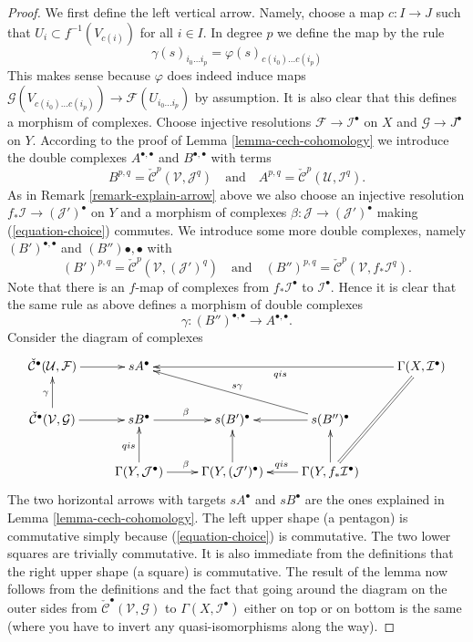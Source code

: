 \begin{proof}
We first define the left vertical arrow. Namely, choose a map
$c : I \to J$ such that $U_i \subset f^{-1}(V_{c(i)})$ for all
$i \in I$. In degree $p$ we define the map by the rule
$$
\gamma(s)_{i_0 \ldots i_p} = \varphi(s)_{c(i_0) \ldots c(i_p)}
$$
This makes sense because $\varphi$ does indeed induce maps
$\mathcal{G}(V_{c(i_0) \ldots c(i_p)}) \to \mathcal{F}(U_{i_0 \ldots i_p})$
by assumption. It is also clear that this defines a morphism of complexes.
Choose injective resolutions
$\mathcal{F} \to \mathcal{I}^\bullet$ on $X$ and
$\mathcal{G} \to J^\bullet$ on $Y$. According to
the proof of Lemma \ref{lemma-cech-cohomology} we introduce the double
complexes $A^{\bullet, \bullet}$ and $B^{\bullet, \bullet}$
with terms
$$
B^{p, q} = \check{\mathcal{C}}^p(\mathcal{V}, \mathcal{J}^q)
\quad
\text{and}
\quad
A^{p, q} = \check{\mathcal{C}}^p(\mathcal{U}, \mathcal{I}^q).
$$
As in Remark \ref{remark-explain-arrow} above we also choose an
injective resolution
$f_*\mathcal{I} \to (\mathcal{J}')^\bullet$ on $Y$ and a morphism
of complexes $\beta : \mathcal{J} \to (\mathcal{J}')^\bullet$
making (\ref{equation-choice}) commutes. We introduce some more
double complexes, namely $(B')^{\bullet, \bullet}$ and
$(B''){\bullet, \bullet}$ with
$$
(B')^{p, q} = \check{\mathcal{C}}^p(\mathcal{V}, (\mathcal{J}')^q)
\quad
\text{and}
\quad
(B'')^{p, q} = \check{\mathcal{C}}^p(\mathcal{V}, f_*\mathcal{I}^q).
$$
Note that there is an $f$-map of complexes from
$f_*\mathcal{I}^\bullet$ to $\mathcal{I}^\bullet$. Hence
it is clear that the same rule as above defines a morphism
of double complexes
$$
\gamma : (B'')^{\bullet, \bullet} \longrightarrow A^{\bullet, \bullet}.
$$
Consider the diagram of complexes
$$
\xymatrix{
\check{\mathcal{C}}^\bullet(\mathcal{U}, \mathcal{F})
\ar[r] &
sA^\bullet & & &
\Gamma(X, \mathcal{I}^\bullet) \ar[lll]^{qis}
\ar@{=}[ddl]\\
\check{\mathcal{C}}^\bullet(\mathcal{V}, \mathcal{G})
\ar[r] \ar[u]^\gamma &
sB^\bullet \ar[r]^\beta &
s(B')^\bullet &
s(B'')^\bullet \ar[l] \ar[llu]_{s\gamma} \\
& \Gamma(Y, \mathcal{J}^\bullet) \ar[u]^{qis} \ar[r]^\beta &
\Gamma(Y, (\mathcal{J}')^\bullet) \ar[u] &
\Gamma(Y, f_*\mathcal{I}^\bullet) \ar[u] \ar[l]_{qis}
}
$$
The two horizontal arrows with targets $sA^\bullet$ and
$sB^\bullet$ are the ones explained in Lemma \ref{lemma-cech-cohomology}.
The left upper shape (a pentagon) is commutative simply
because (\ref{equation-choice}) is commutative.
The two lower squares are trivially commutative.
It is also immediate from the definitions that the
right upper shape (a square) is commutative.
The result of the lemma now follows from the definitions
and the fact that going around the diagram on the outer sides
from $\check{\mathcal{C}}^\bullet(\mathcal{V}, \mathcal{G})$
to $\Gamma(X, \mathcal{I}^\bullet)$ either on top or on bottom
is the same (where you have to invert any quasi-isomorphisms along the way).
\end{proof}






